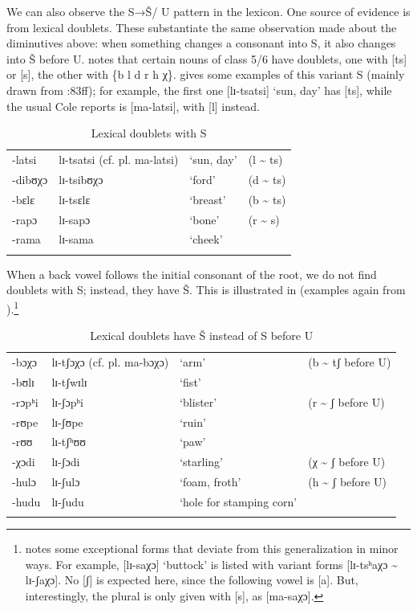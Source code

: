 \documentclass[output=paper,newtxmath,modfonts,nonflat]{langsci/langscibook}
\begin{document}
We can also observe the S→Š/ {\longrule} U pattern in the lexicon. One source of evidence is from lexical doublets. These substantiate the same observation made about the diminutives above: when something changes a consonant into S, it also changes into Š before U. \citet[83ff]{Cole1955} notes that certain nouns of class 5/6 have doublets, one with [ts] or [s], the other with \{b l d r h χ\}.  gives some examples of this variant S (mainly drawn from \citealt{Cole1955}:83ff); for example, the first one [lɪ-tsatsi] ‘sun, day’ has [ts], while the usual  Cole reports is [ma-latsi], with [l] instead.
%
\begin{table}
\begin{tabularx}{\textwidth}{llXX}
\lsptoprule

-latsi & lɪ-tsatsi (cf. pl. ma-latsi) & ‘sun, day’ & (l {\textasciitilde} ts)\\
-dibʊχɔ & lɪ-tsibʊχɔ & ‘ford’ & (d {\textasciitilde} ts)\\
-bɛlɛ & lɪ-tsɛlɛ & ‘breast’ & (b {\textasciitilde} ts)\\
-rapɔ & lɪ-sapɔ & ‘bone’ & (r {\textasciitilde} s) \\
-rama & lɪ-sama & ‘cheek’ & \\
\lspbottomrule
\end{tabularx}
\caption{Lexical doublets with S}
\label{tab:bennett:4}
\end{table}

When a back vowel follows the initial consonant of the root, we do not find doublets with S; instead, they have Š. This is illustrated in  (examples again from \citealt{Cole1955}).\footnote{\citet[83]{Cole1955} notes some exceptional forms that deviate from this generalization in minor ways. For example, [lɪ-saχɔ] ‘buttock’ is listed with variant forms [lɪ-tsʰaχɔ {\textasciitilde} lɪ-ʃaχɔ]. No [ʃ] is expected here, since the following vowel is [a]. But, interestingly, the plural is only given with [s], as [ma-saχɔ].}
\begin{table}
\begin{tabularx}{\textwidth}{lllX}
\lsptoprule

-bɔχɔ & lɪ-tʃɔχɔ
(cf. pl. ma-bɔχɔ) & ‘arm’ & (b {\textasciitilde} tʃ before U)\\
-bʊlɪ & lɪ-tʃwɪlɪ & ‘fist’ & \\
-rɔpʰi & lɪ-ʃɔpʰi & ‘blister’ & (r {\textasciitilde} ʃ before U)\\
-rʊpe & lɪ-ʃʊpe & ‘ruin’ & \\
-rʊʊ & lɪ-tʃʰʊʊ & ‘paw’ & \\
-χɔdi & lɪ-ʃɔdi & ‘starling’ & (χ {\textasciitilde} ʃ before U)\\
-hulɔ & lɪ-ʃulɔ & ‘foam, froth’ & (h {\textasciitilde} ʃ before U)\\
-hudu & lɪ-ʃudu & ‘hole for stamping corn’ & \\
\lspbottomrule
\end{tabularx}
\caption{Lexical doublets have Š instead of S before U}
\label{tab:bennett:5}
\end{table}
\end{document}
